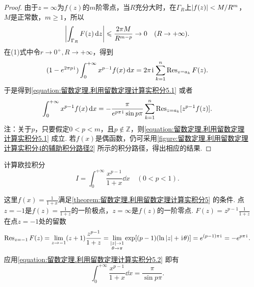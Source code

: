 \begin{theorem}
\begin{proof}
由于\(z=\infty\)为\(f(z)\)的\(m\)阶零点，当\(R\)充分大时，在\(\Gamma_R\)上\(\abs{f(z)}<M/R^m\)，\(M\)是正常数，\(m\geqslant1\)，所以\[
\abs{\int_{\Gamma_R} F(z) \dd{z}}
\leqslant \frac{2\pi M}{R^{m-p}} \to0\quad(R\to+\infty).
\]在(1)式中令\(r\to0^+,R\to+\infty\)，得到\[
(1-e^{2\pi p\kern1pt\mathrm{i}\kern1pt}) \int_0^{+\infty} x^{p-1} f(x) \dd{x}
= 2\pi\kern1pt\mathrm{i}\kern1pt \sum\limits_{k=1}^n \operatorname{Res}_{z=a_k} F(z).
\]于是得到\cref{equation:留数定理.利用留数定理计算实积分5.1} 或者\begin{equation}\label{equation:留数定理.利用留数定理计算实积分5.2}
\int_0^{+\infty} x^{p-1} f(x) \dd{x}
= -\frac{\pi}{e^{p\pi\kern1pt\mathrm{i}\kern1pt} \sin p\pi} \sum\limits_{k=1}^n \operatorname{Res}_{z=a_k}[z^{p-1} f(z)].
\end{equation}
注：关于\(p\)，只要假定\(0<p<m\)，且\(p\notin\mathbb{Z}\)，则\cref{equation:留数定理.利用留数定理计算实积分5.1} 成立.
若\(f(x)\)是偶函数，仍可采用\cref{figure:留数定理.利用留数定理计算实积分4的辅助积分路径2} 所示的积分路径，得出相应的结果.
\end{proof}
\end{theorem}

\begin{example}
计算欧拉积分\[
I = \int_0^{+\infty} \frac{x^{p-1}}{1+x} \dd{x} \quad(0<p<1).
\]
\begin{solution}
这里\(f(x) = \frac{1}{1+x}\)满足\cref{theorem:留数定理.利用留数定理计算实积分5} 的条件.
点\(z=-1\)是\(f(z) = \frac{1}{1+z}\)的一阶极点，\(z=\infty\)是\(f(z)\)的一阶零点.
\(F(z) = z^{p-1} \frac{1}{1+z}\)在点\(z=-1\)处的留数\[
\operatorname{Res}_{z=-1} F(z)
= \lim\limits_{z\to-1} (z+1) \frac{z^{p-1}}{1+z}
= \lim\limits_{\substack{\abs{z}\to1 \\ \theta\to\pi}} \exp[(p-1)(\ln\abs{z}+\kern1pt\mathrm{i}\kern1pt\theta)]
= e^{(p-1)\pi\kern1pt\mathrm{i}\kern1pt}
= -e^{p\pi\kern1pt\mathrm{i}\kern1pt}.
\]应用\cref{equation:留数定理.利用留数定理计算实积分5.2} 即有\begin{equation}
\int_0^{+\infty} \frac{x^{p-1}}{1+x} \dd{x} = \frac{\pi}{\sin p\pi}.
\end{equation}
\end{solution}
\end{example}

